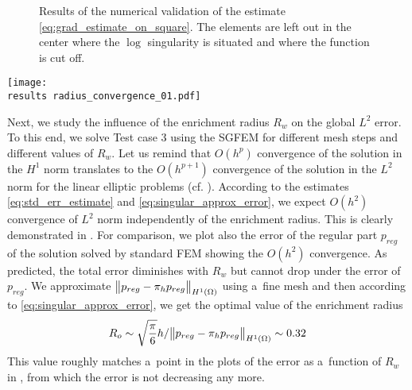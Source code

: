 %
\begin{figure}[!htb]
  \centering    
  \hspace{0pt}
  \caption[Log error estimate.]
  {
  Results of the numerical validation of the estimate \eqref{eq:grad_estimate_on_square}. The elements are left out 
  in the center where the $\log$ singularity is situated and where the function is cut off.
  }
  \label{fig:log_estimate}
\end{figure}
%

\begin{graph}[!htb]
  \centering    
  \texttt{[image: \\results radius\_convergence\_01.pdf]}
  \caption[Convergence for different enrichment radii.]{Convergence graph for different enrichment radii. The "FEM reg"
  data comes from the problem without the singularity solved by the standard FEM -- it has the optimal convergence order 2.0.}
  \label{graph:radius_conv_1}
\end{graph}
%
Next, we study the influence of the enrichment radius $R_w$ on the global $L^2$ error. To this end, we solve Test case 3
using the SGFEM for different mesh steps and different values of $R_w$.
Let us remind that $O(h^p)$ convergence of the solution in the $H^1$ norm translates to the $O(h^{p+1})$ convergence of the solution in the $L^2$ norm 
for the linear elliptic problems (cf. \cite[Theorem 19.2]{ciarlet_basic_1991}). According to the estimates \eqref{eq:std_err_estimate}
and \eqref{eq:singular_approx_error}, we expect $O(h^2)$ convergence of $L^2$ norm independently of the enrichment radius. This is 
clearly demonstrated in . For comparison, we plot also the error of the regular part $p_{reg}$ of the solution
solved by standard FEM showing the $O(h^2)$ convergence.
As predicted, the total error diminishes with $R_w$ but cannot 
drop under the error of $p_{reg}$. We approximate $\bigl\Vert p_{reg} - \pi_h p_{reg}\bigr\Vert_{H^1(\Omega)}$
using a~fine mesh and then according to \eqref{eq:singular_approx_error},
we get the optimal value of the enrichment radius
\[
    R_o \sim \sqrt{\frac{\pi}{6}} h/\bigl\Vert p_{reg} - \pi_h p_{reg}\bigr\Vert_{H^1(\Omega)} \sim 0.32
\]
This value roughly matches a~point in the plots of the error as a~function of $R_w$ in
, from which the error is not decreasing any more.



